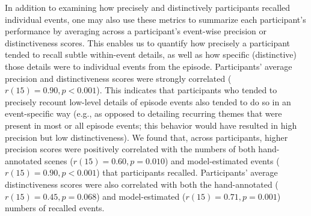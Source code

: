 \documentclass[10pt]{article}
\begin{document}
In addition to examining how precisely and distinctively participants recalled individual events, one may also use these metrics to summarize each participant's performance by averaging across a participant's event-wise precision or distinctiveness scores.  This enables us to quantify how precisely a participant tended to recall subtle within-event details, as well as how specific (distinctive) those details were to individual events from the episode.  Participants' average precision and distinctiveness scores were strongly correlated ($r(15) = 0.90, p < 0.001$).  This indicates that participants who tended to precisely recount low-level details of episode events also tended to do so in an event-specific way (e.g., as opposed to detailing recurring themes that were present in most or all episode events; this behavior would have resulted in high precision but low distinctiveness).  We found that, across participants, higher precision scores were positively correlated with the numbers of both hand-annotated scenes ($r(15) = 0.60, p = 0.010$) and model-estimated events ($r(15) = 0.90, p < 0.001$) that participants recalled.  Participants' average distinctiveness scores were also correlated with both the hand-annotated ($r(15) = 0.45, p = 0.068$) and model-estimated ($r(15) = 0.71, p = 0.001$) numbers of recalled events.
\end{document}
